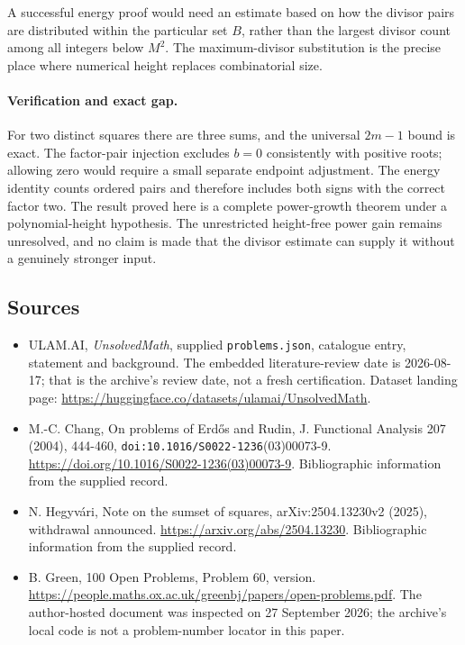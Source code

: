 \documentclass[11pt,a4paper]{article}
\begin{document}
A successful energy proof would need an estimate based on how the divisor pairs are distributed within the particular set $B$, rather than the largest divisor count among all integers below $M^2$. The maximum-divisor substitution is the precise place where numerical height replaces combinatorial size.

\paragraph{Verification and exact gap.}
For two distinct squares there are three sums, and the universal $2m-1$ bound is exact. The factor-pair injection excludes $b=0$ consistently with positive roots; allowing zero would require a small separate endpoint adjustment. The energy identity counts ordered pairs and therefore includes both signs with the correct factor two. The result proved here is a complete power-growth theorem under a polynomial-height hypothesis. The unrestricted height-free power gain remains unresolved, and no claim is made that the divisor estimate can supply it without a genuinely stronger input.

\subsection{Sources}

{\small

\begin{itemize}

\item[\hypertarget{source:statement:1}{S1}] ULAM.AI, \emph{UnsolvedMath}, supplied \texttt{problems.json}, catalogue entry, statement and background. The embedded literature-review date is 2026-08-17; that is the archive’s review date, not a fresh certification. Dataset landing page: \url{https://huggingface.co/datasets/ulamai/UnsolvedMath}.

\item[\hypertarget{source:statement:2}{S2}] M.-C. Chang, On problems of Erdős and Rudin, J. Functional Analysis 207 (2004), 444-460, \nolinkurl{doi:10.1016/S0022-1236}(03)00073-9. \url{https://doi.org/10.1016/S0022-1236(03)00073-9}. Bibliographic information from the supplied record.

\item[\hypertarget{source:statement:3}{S3}] N. Hegyvári, Note on the sumset of squares, arXiv:2504.13230v2 (2025), withdrawal announced. \url{https://arxiv.org/abs/2504.13230}. Bibliographic information from the supplied record.

\item[\hypertarget{source:statement:4}{S4}] B. Green, 100 Open Problems, Problem 60, version. \url{https://people.maths.ox.ac.uk/greenbj/papers/open-problems.pdf}. The author-hosted document was inspected on 27 September 2026; the archive’s local code is not a problem-number locator in this paper.

\end{itemize}

}

\label{end:statement}
\end{document}
